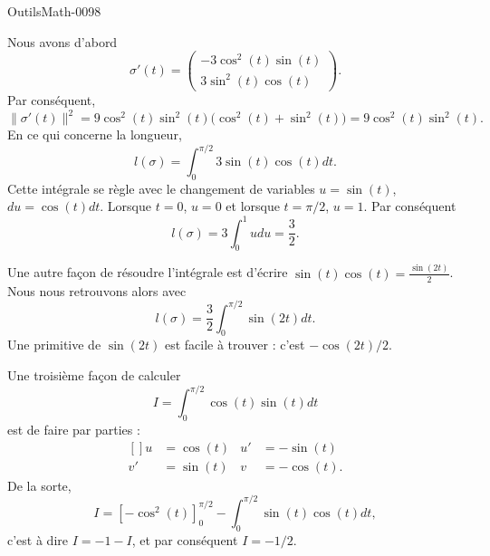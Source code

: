 
\begin{corrige}{OutilsMath-0098}

    Nous avons d'abord
    \begin{equation}
        \sigma'(t)=\begin{pmatrix}
            -3\cos^2(t)\sin(t)    \\ 
            3\sin^2(t)\cos(t)    
        \end{pmatrix}.
    \end{equation}
    Par conséquent,
    \begin{equation}
        \| \sigma'(t) \|^2=9\cos^2(t)\sin^2(t)\big( \cos^2(t)+\sin^2(t) \big)=9\cos^2(t)\sin^2(t).
    \end{equation}
    En ce qui concerne la longueur,
    \begin{equation}
        l(\sigma)=\int_0^{\pi/2}3\sin(t)\cos(t)dt.
    \end{equation}
    Cette intégrale se règle avec le changement de variables $u=\sin(t)$, $du=\cos(t)dt$. Lorsque $t=0$, $u=0$ et lorsque $t=\pi/2$, $u=1$. Par conséquent
    \begin{equation}
        l(\sigma)=3\int_0^1 udu=\frac{ 3 }{2}.
    \end{equation}

    Une autre façon de résoudre l'intégrale est d'écrire $\sin(t)\cos(t)=\frac{ \sin(2t) }{2}$. Nous nous retrouvons alors avec
    \begin{equation}
        l(\sigma)=\frac{ 3 }{ 2 }\int_0^{\pi/2}\sin(2t)dt.
    \end{equation}
    Une primitive de $\sin(2t)$ est facile à trouver : c'est $-\cos(2t)/2$.

    Une troisième façon de calculer
    \begin{equation}
        I=\int_0^{\pi/2}\cos(t)\sin(t)dt
    \end{equation}
    est de faire par parties :
    \begin{equation}
        \begin{aligned}[]
            u&=\cos(t)&u'&=-\sin(t)\\
            v'&=\sin(t)&v&=-\cos(t).
        \end{aligned}
    \end{equation}
    De la sorte,
    \begin{equation}
        I=\left[ -\cos^2(t) \right]_0^{\pi/2}-\int_0^{\pi/2}\sin(t)\cos(t)dt,
    \end{equation}
    c'est à dire $I=-1-I$, et par conséquent $I=-1/2$.
\end{corrige}
